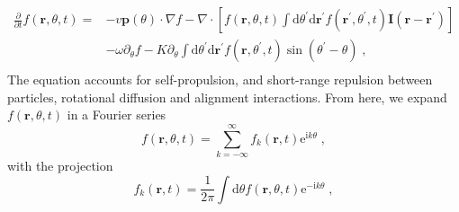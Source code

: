 \documentclass[10pt,aspectratio=43,mathserif,table]{beamer}
\begin{document}
\begin{frame}
    \small
    \begin{equation}
        \begin{aligned}
            \frac{\partial}{\partial t}f\left( \mathbf{r},\theta ,t \right) =&-v\mathbf{p}\left( \theta \right) \cdot \nabla f-\nabla \cdot \left[ f\left( \mathbf{r},\theta ,t \right) \int{\mathrm{d}\theta ^{\prime}\mathrm{d}\mathbf{r}^{\prime}f\left( \mathbf{r}^{\prime},\theta ^{\prime},t \right) \mathbf{I}\left( \mathbf{r}-\mathbf{r}^{\prime} \right)} \right]\\
            &-\omega \partial _{\theta}f-K\partial _{\theta}\int{\mathrm{d}\theta ^{\prime}\mathrm{d}\mathbf{r}^{\prime}f\left( \mathbf{r},\theta ^{\prime},t \right) \sin \left( \theta ^{\prime}-\theta \right)}\;,\\
        \end{aligned}
    \end{equation}
    The equation accounts for self-propulsion, and short-range repulsion between particles, rotational diffusion and alignment interactions. 
    From here, we expand $f\left( \mathbf{r},\theta ,t \right)$ in a Fourier series 
    \begin{equation}
        f \left( \mathbf{r},\theta ,t \right) =\sum_{k=-\infty}^{\infty}{f _{k}\left( \mathbf{r},t \right) \mathrm{e}^{\mathrm{i}k\theta}}\;,
    \end{equation} 
    with the projection 
    \begin{equation}
        \label{eq:fourierCoefficients}
        f _{k}\left( \mathbf{r},t \right) =\frac{1}{2\pi}\int{\mathrm{d}\theta f \left( \mathbf{r},\theta ,t \right) \mathrm{e}^{-\mathrm{i}k\theta}}\;,
    \end{equation}
\end{frame}
\end{document}
